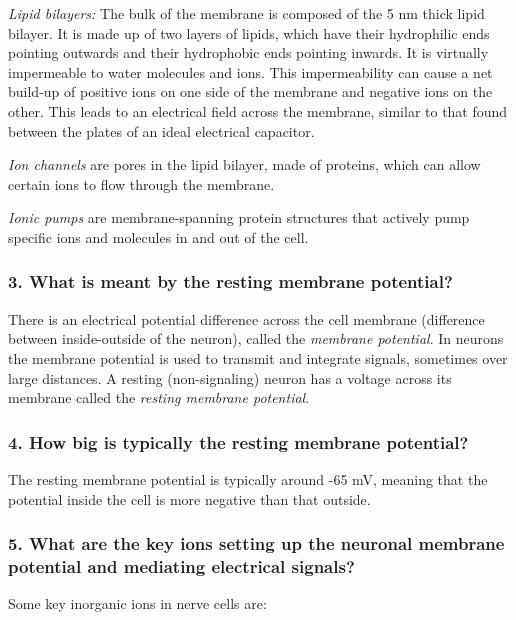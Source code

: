 \textit{Lipid bilayers:} The bulk of the membrane is composed of the 5 nm thick lipid bilayer. It is made up of two layers of lipids, which have their hydrophilic ends pointing outwards and their hydrophobic ends pointing inwards. It is virtually impermeable to water molecules and ions. This impermeability can cause a net build-up of positive ions on one side of the membrane and negative ions on the other. This leads to an electrical field across the membrane, similar to that found between the plates of an ideal electrical capacitor.

\textit{Ion channels} are pores in the lipid bilayer, made of proteins, which can allow certain ions to flow through the membrane. 

\textit{Ionic pumps} are membrane-spanning protein structures that actively pump specific ions and molecules in and out of the cell. 

\subsubsection{3. What is meant by the resting membrane potential?}

There is an electrical potential difference across the cell membrane (difference between inside-outside of the neuron), called the \textit{membrane potential}. In neurons the membrane potential is used to transmit and integrate signals, sometimes over large distances. A resting (non-signaling) neuron has a voltage across its membrane called the \textit{resting membrane potential}. 

\subsubsection{4. How big is typically the resting membrane potential?}

The resting membrane potential is typically around -65 mV, meaning that the potential inside the cell is more negative than that outside.

\subsubsection{5. What are the key ions setting up the neuronal membrane potential and mediating electrical signals?}

Some key inorganic ions in nerve cells are: 

